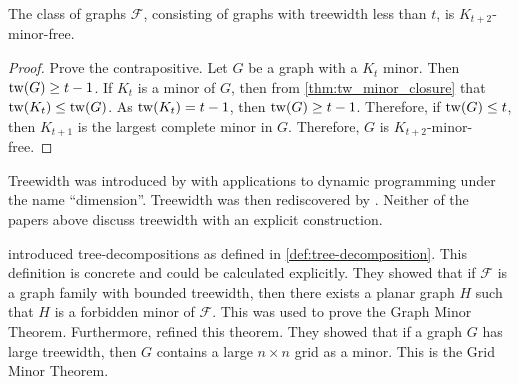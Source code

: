 

\begin{proposition}\label{thm:treewidth_clique-minor-free}
	The class of graphs $\mathcal{F}$, consisting of graphs with treewidth less than $t$, is $K_{t+2}$-minor-free. 
\end{proposition}
\begin{proof}
	Prove the contrapositive. Let $G$ be a graph with a $K_t$ minor. Then \(\operatorname{tw}(G) \geq t-1\).
	If \(K_t\) is a minor of \(G\), then from \cref{thm:tw_minor_closure} that \(\operatorname{tw}(K_t) \leq \operatorname{tw}(G)\). As \(\operatorname{tw}(K_t) = t-1\), then \(\operatorname{tw}(G) \geq t - 1\). Therefore, if $\operatorname{tw}(G) \leq t$, then $K_{t+1}$ is the largest complete minor in $G$. Therefore, $G$ is $K_{t + 2}$-minor-free. 
\end{proof}

Treewidth was introduced by \textcite{berteleChapterEliminationVariables1972} with applications to dynamic programming under the name ``dimension''. Treewidth was then rediscovered by \textcite{halinSfunctionsGraphs1976}. Neither of the papers above discuss treewidth with an explicit construction.

\textcite{robertsonGraphMinorsIII1984} introduced tree-decompositions as defined in \cref{def:tree-decomposition}. This definition is concrete and could be calculated explicitly. They showed that if $\mathcal{F}$ is a graph family with bounded treewidth, then there exists a planar graph $H$ such that $H$ is a forbidden minor of $\mathcal{F}$. This was used to prove the Graph Minor Theorem. Furthermore, \textcite{robertsonQuicklyExcludingPlanar1994} refined this theorem. They showed that if a graph $G$ has large treewidth, then $G$ contains a large $n \times n$ grid as a minor. This is the Grid Minor Theorem.